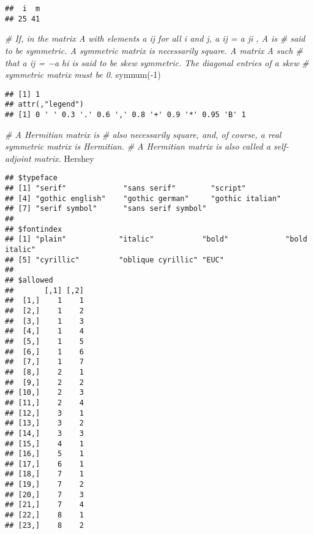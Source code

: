 \documentclass[
]{article}
\newenvironment{Shaded}{\begin{snugshade}}{\end{snugshade}}
\newcommand{\CommentTok}[1]{\textcolor[rgb]{0.56,0.35,0.01}{\textit{#1}}}
\newcommand{\DecValTok}[1]{\textcolor[rgb]{0.00,0.00,0.81}{#1}}
\newcommand{\FunctionTok}[1]{\textcolor[rgb]{0.00,0.00,0.00}{#1}}
\newcommand{\NormalTok}[1]{#1}
\newcommand{\SpecialCharTok}[1]{\textcolor[rgb]{0.00,0.00,0.00}{#1}}
\begin{document}
\begin{verbatim}
##  i  m 
## 25 41
\end{verbatim}

\begin{Shaded}
\begin{Highlighting}[]
\CommentTok{\# If, in the matrix A with elements a ij for all i and j, a ij = a ji , A is }
\CommentTok{\# said to be symmetric. A symmetric matrix is necessarily square. A matrix A such}
\CommentTok{\# that a ij = −a hi is said to be skew symmetric. The diagonal entries of a skew}
\CommentTok{\# symmetric matrix must be 0.}
\FunctionTok{symnum}\NormalTok{(}\SpecialCharTok{{-}}\DecValTok{1}\NormalTok{)}
\end{Highlighting}
\end{Shaded}

\begin{verbatim}
## [1] 1
## attr(,"legend")
## [1] 0 ' ' 0.3 '.' 0.6 ',' 0.8 '+' 0.9 '*' 0.95 'B' 1
\end{verbatim}

\begin{Shaded}
\begin{Highlighting}[]
\CommentTok{\# A Hermitian matrix is}
\CommentTok{\# also necessarily square, and, of course, a real symmetric matrix is Hermitian.}
\CommentTok{\# A Hermitian matrix is also called a self{-}adjoint matrix.}
\NormalTok{Hershey}
\end{Highlighting}
\end{Shaded}

\begin{verbatim}
## $typeface
## [1] "serif"             "sans serif"        "script"           
## [4] "gothic english"    "gothic german"     "gothic italian"   
## [7] "serif symbol"      "sans serif symbol"
## 
## $fontindex
## [1] "plain"            "italic"           "bold"             "bold italic"     
## [5] "cyrillic"         "oblique cyrillic" "EUC"             
## 
## $allowed
##       [,1] [,2]
##  [1,]    1    1
##  [2,]    1    2
##  [3,]    1    3
##  [4,]    1    4
##  [5,]    1    5
##  [6,]    1    6
##  [7,]    1    7
##  [8,]    2    1
##  [9,]    2    2
## [10,]    2    3
## [11,]    2    4
## [12,]    3    1
## [13,]    3    2
## [14,]    3    3
## [15,]    4    1
## [16,]    5    1
## [17,]    6    1
## [18,]    7    1
## [19,]    7    2
## [20,]    7    3
## [21,]    7    4
## [22,]    8    1
## [23,]    8    2
\end{verbatim}
\end{document}
